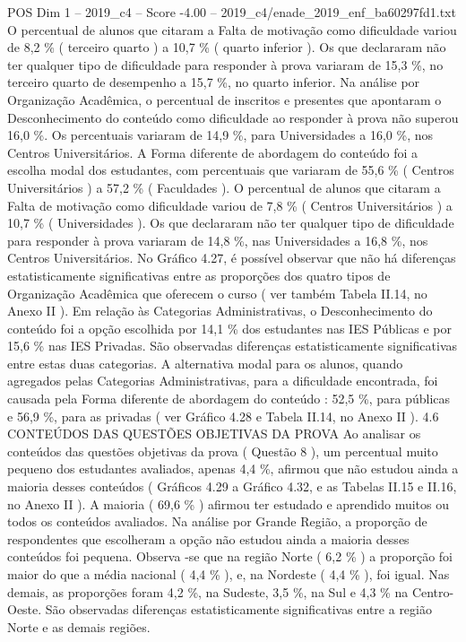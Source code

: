 \begin{textsample}{POS Dim 1 – 2019\_c4 – Score -4.00 – 2019\_c4/enade\_2019\_enf\_ba60297fd1.txt}
O percentual de alunos que citaram a Falta de motivação como dificuldade variou de 8,2 \% ( terceiro quarto ) a 10,7 \% ( quarto inferior ).
Os que declararam não ter qualquer tipo de dificuldade para responder à prova variaram de 15,3 \%, no terceiro quarto de desempenho a 15,7 \%, no quarto inferior.
Na análise por Organização Acadêmica, o percentual de inscritos e presentes que apontaram o Desconhecimento do conteúdo como dificuldade ao responder à prova não superou 16,0 \%.
Os percentuais variaram de 14,9 \%, para Universidades a 16,0 \%, nos Centros Universitários.
A Forma diferente de abordagem do conteúdo foi a escolha modal dos estudantes, com percentuais que variaram de 55,6 \% ( Centros Universitários ) a 57,2 \% ( Faculdades ).
O percentual de alunos que citaram a Falta de motivação como dificuldade variou de 7,8 \% ( Centros Universitários ) a 10,7 \% ( Universidades ).
Os que declararam não ter qualquer tipo de dificuldade para responder à prova variaram de 14,8 \%, nas Universidades a 16,8 \%, nos Centros Universitários.
No Gráfico 4.27, é possível observar que não há diferenças estatisticamente significativas entre as proporções dos quatro tipos de Organização Acadêmica que oferecem o curso ( ver também Tabela II.14, no Anexo II ).
Em relação às Categorias Administrativas, o Desconhecimento do conteúdo foi a opção escolhida por 14,1 \% dos estudantes nas IES Públicas e por 15,6 \% nas IES Privadas.
São observadas diferenças estatisticamente significativas entre estas duas categorias.
A alternativa modal para os alunos, quando agregados pelas Categorias Administrativas, para a dificuldade encontrada, foi causada pela Forma diferente de abordagem do conteúdo : 52,5 \%, para públicas e 56,9 \%, para as privadas ( ver Gráfico 4.28 e Tabela II.14, no Anexo II ). 4.6 CONTEÚDOS DAS QUESTÕES OBJETIVAS DA PROVA Ao analisar os conteúdos das questões objetivas da prova ( Questão 8 ), um percentual muito pequeno dos estudantes avaliados, apenas 4,4 \%, afirmou que não estudou ainda a maioria desses conteúdos ( Gráficos 4.29 a Gráfico 4.32, e as Tabelas II.15 e II.16, no Anexo II ).
A maioria ( 69,6 \% ) afirmou ter estudado e aprendido muitos ou todos os conteúdos avaliados.
Na análise por Grande Região, a proporção de respondentes que escolheram a opção não estudou ainda a maioria desses conteúdos foi pequena.
Observa -se que na região Norte ( 6,2 \% ) a proporção foi maior do que a média nacional ( 4,4 \% ), e, na Nordeste ( 4,4 \% ), foi igual.
Nas demais, as proporções foram 4,2 \%, na Sudeste, 3,5 \%, na Sul e 4,3 \% na Centro-Oeste.
São observadas diferenças estatisticamente significativas entre a região Norte e as demais regiões.

\end{textsample}
